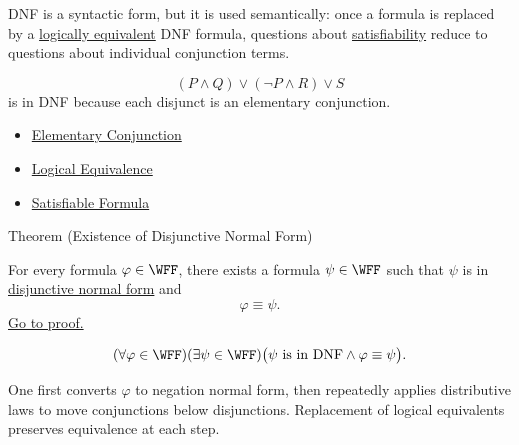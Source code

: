 \begin{remark*}[Interpretation]
DNF is a syntactic form, but it is used semantically: once a formula is replaced
by a \hyperref[def:logical-equivalence-propositional-logic]{logically equivalent}
DNF formula, questions about
\hyperref[def:satisfiable-formula-propositional-logic]{satisfiability} reduce
to questions about individual conjunction terms.
\end{remark*}

\begin{example*}[Examples]
\[
(P\land Q)\lor(\neg P\land R)\lor S
\]
is in DNF because each disjunct is an elementary conjunction.
\end{example*}

\begin{dependencies}
\begin{itemize}
  \item \hyperref[def:elementary-conjunction-propositional-logic]{Elementary Conjunction}
  \item \hyperref[def:logical-equivalence-propositional-logic]{Logical Equivalence}
  \item \hyperref[def:satisfiable-formula-propositional-logic]{Satisfiable Formula}
\end{itemize}
\end{dependencies}

\begin{theorembox}{Theorem (Existence of Disjunctive Normal Form)}
\begin{theorem}
\label{thm:existence-disjunctive-normal-form-propositional-logic}
For every formula \(\varphi\in\WFF\), there exists a formula
\(\psi\in\WFF\) such that \(\psi\) is in
\hyperref[def:disjunctive-normal-form-propositional-logic]{disjunctive normal form}
and
\[
\varphi\equiv\psi.
\]
\noindent\hyperref[prf:existence-disjunctive-normal-form-propositional-logic]{Go to proof.}
\end{theorem}
\end{theorembox}

\begin{remark*}
\[
(\forall\varphi\in\WFF)(\exists\psi\in\WFF)
\bigl(\psi\text{ is in DNF}\land \varphi\equiv\psi\bigr).
\]
\end{remark*}

\begin{remark*}[Interpretation]
One first converts \(\varphi\) to negation normal form, then repeatedly applies
distributive laws to move conjunctions below disjunctions. Replacement of
logical equivalents preserves equivalence at each step.
\end{remark*}

